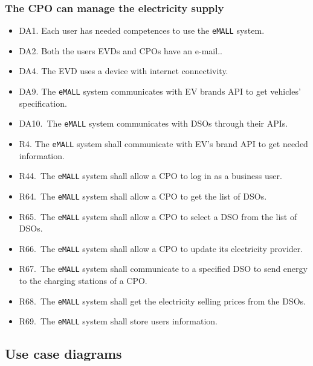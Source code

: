 \subsubsection{The CPO can manage the electricity supply}
\begin{itemize}
    \item DA1. Each user has needed competences to use the \verb|eMALL| system.
    \item DA2. Both the users EVDs and CPOs have an e-mail..
    \item DA4. The EVD uses a device with internet connectivity.
    \item DA9. The \verb|eMALL| system communicates with EV brands API to get vehicles’ specification.
    \item DA10.\ The \verb|eMALL| system communicates with DSOs through their APIs.
    \item R4. The \verb|eMALL| system shall communicate with EV’s brand API to get needed information.
    \item R44.\ The \verb|eMALL| system shall allow a CPO to log in as a business user.
    \item R64.\ The \verb|eMALL| system shall allow a CPO to get the list of DSOs.
    \item R65.\ The \verb|eMALL| system shall allow a CPO to select a DSO from the list of DSOs.
    \item R66.\ The \verb|eMALL| system shall allow a CPO to update its electricity provider.
    \item R67.\ The \verb|eMALL| system shall communicate to a specified DSO to send energy to the
    charging stations of a CPO\@.
    \item R68.\ The \verb|eMALL| system shall get the electricity selling prices from the DSOs.
    \item R69.\ The \verb|eMALL| system shall store users information.
\end{itemize}

\newpage

\subsection{Use case diagrams}
\label{subsec: use_case_diag}%
